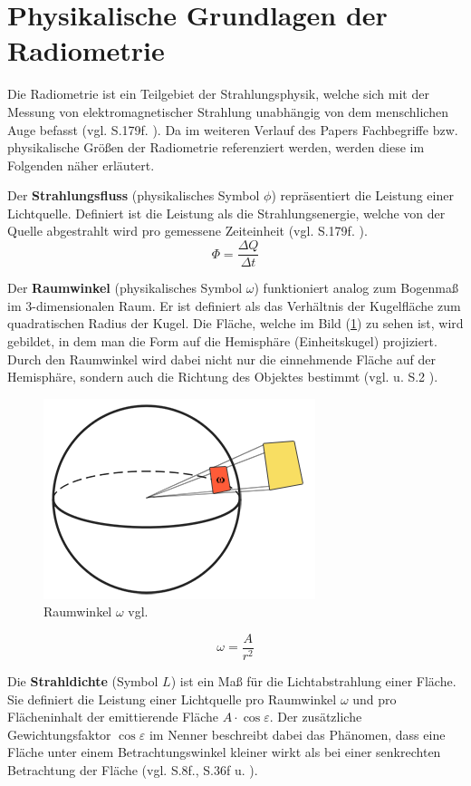 \documentclass[
  11pt,
  a4paper,
  oneside
  ]{article}
\begin{document}
\section{Physikalische Grundlagen der Radiometrie}\label{sec:radiometrie}
Die Radiometrie ist ein Teilgebiet der Strahlungsphysik, welche sich mit der Messung von elektromagnetischer Strahlung unabhängig von dem menschlichen Auge befasst 
(vgl. S.179f. \cite{Beyerer2016}). Da im weiteren Verlauf des Papers Fachbegriffe bzw. physikalische Größen der Radiometrie referenziert werden, werden diese im Folgenden näher erläutert. 

Der \textbf{Strahlungsfluss} (physikalisches Symbol $\phi$) repräsentiert die Leistung einer Lichtquelle. Definiert ist die Leistung als die Strahlungsenergie, welche von der Quelle abgestrahlt wird pro gemessene Zeiteinheit (vgl. S.179f. \cite{Beyerer2016}). 
\begin{equation}
  \Phi =\dfrac{\Delta Q}{\Delta t}
\end{equation}

Der \textbf{Raumwinkel} (physikalisches Symbol $\omega$) funktioniert analog zum Bogenmaß im 3-dimensionalen Raum. Er ist definiert als das Verhältnis der Kugelfläche zum quadratischen Radius der Kugel. Die Fläche, welche im Bild
(\ref{fig:img6}) zu sehen ist, wird gebildet, in dem man die Form auf die Hemisphäre (Einheitskugel) projiziert. Durch den Raumwinkel wird dabei nicht nur die einnehmende Fläche auf der Hemisphäre, sondern auch die Richtung des Objektes bestimmt 
(vgl. \cite{learnOpenGL} u. S.2 \cite{irrlichtOrg}). 
\begin{figure}[H]
  \centering
  \includegraphics*[width=0.35 \textwidth]{images/solid_angle.png}
  \caption{Raumwinkel $\omega$ vgl. \cite{learnOpenGL}}
  \label{fig:img6}
\end{figure}
\begin{equation}
  \omega =\dfrac{A}{r^{2}}
\end{equation}

Die \textbf{Strahldichte} (Symbol $L$) ist ein Maß für die Lichtabstrahlung einer Fläche. Sie definiert die Leistung einer Lichtquelle pro Raumwinkel $\omega$ und pro Flächeninhalt der emittierende Fläche $A\cdot \cos \varepsilon$. Der zusätzliche Gewichtungsfaktor $\cos \varepsilon$ im Nenner beschreibt dabei das Phänomen, dass eine Fläche unter einem Betrachtungswinkel kleiner wirkt als bei einer senkrechten Betrachtung der Fläche 
(vgl. S.8f.\cite{GrundlagenLichtTechnik}, S.36f \cite{radiometrischeGrundbegriffe} u. \cite{vgb,learnOpenGL}).
\end{document}
